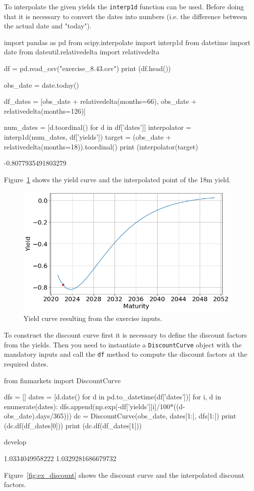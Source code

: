 \cprotEnv\begin{solution}
To interpolate the given yields the \texttt{interp1d} function can be used. Before doing that it is necessary to convert the dates into numbers (i.e. the difference between the actual date and "today").
\begin{ipython}
import pandas as pd
from scipy.interpolate import interp1d
from datetime import date
from dateutil.relativedelta import relativedelta

df = pd.read_csv("exercise_8.43.csv")
print (df.head())

obs_date = date.today()

df_dates = [obs_date + relativedelta(months=66),
            obs_date + relativedelta(months=126)]

num_dates = [d.toordinal() for d in df['dates']]
interpolator = interp1d(num_dates, df['yields'])
target = (obs_date + relativedelta(months=18)).toordinal()
print (interpolator(target)
\end{ipython}
\begin{ioutput}
-0.8077935491803279
\end{ioutput}

Figure~\ref{fig:ex_yield} shows the yield curve and the interpolated point of the 18m yield.

\begin{figure}[htpb]
\centering
\includegraphics[width=0.7\linewidth]{figures/ex_yield}
\caption{Yield curve resulting from the exercise inputs.}
\label{fig:ex_yield}
\end{figure}

To construct the discount curve first it is necessary to define the discount factors from the yields. Then you need to instantiate a \texttt{DiscountCurve} object with the mandatory inputs and call the \texttt{df} method to compute the discount factors at the required dates.
\begin{ipython}
from finmarkets import DiscountCurve

dfs = []
dates = [d.date() for d in pd.to_datetime(df['dates'])]
for i, d in enumerate(dates):
    dfs.append(np.exp(-df['yields'][i]/100*((d-obs_date).days/365)))
dc = DiscountCurve(obs_date, dates[1:], dfs[1:])
print (dc.df(df_dates[0]))
print (dc.df(df_dates[1]))
\end{ipython}develop
\begin{ioutput}
1.0334049958222
1.0329281686679732
\end{ioutput}
\noindent
Figure~\ref{fig:ex_discount} shows the discount curve and the interpolated discount factors.


\end{solution}
